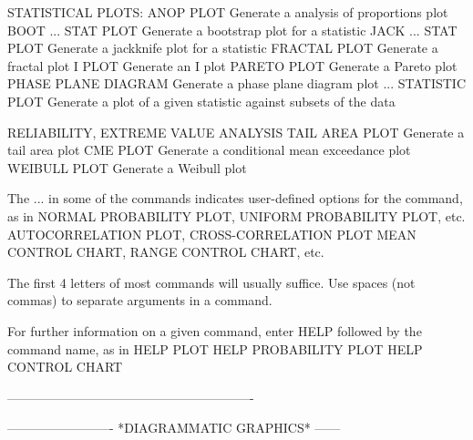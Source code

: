 STATISTICAL PLOTS:
   ANOP PLOT             Generate a analysis of proportions plot
   BOOT ... STAT PLOT    Generate a bootstrap plot for a statistic
   JACK ... STAT PLOT    Generate a jackknife plot for a statistic
   FRACTAL PLOT          Generate a fractal plot
   I PLOT                Generate an I plot
   PARETO PLOT           Generate a Pareto plot
   PHASE PLANE DIAGRAM   Generate a phase plane diagram plot
   ... STATISTIC PLOT    Generate a plot of a given statistic against
                         subsets of the data
 
RELIABILITY, EXTREME VALUE ANALYSIS
   TAIL AREA PLOT        Generate a tail area plot
   CME PLOT              Generate a conditional mean exceedance plot
   WEIBULL PLOT          Generate a Weibull plot
 
The ... in some of the commands indicates user-defined options for the
command, as in
   NORMAL PROBABILITY PLOT, UNIFORM PROBABILITY PLOT, etc.
   AUTOCORRELATION PLOT, CROSS-CORRELATION PLOT
   MEAN CONTROL CHART, RANGE CONTROL CHART, etc.
 
The first 4 letters of most commands will usually suffice.  Use spaces
(not commas) to separate arguments in a command.
 
For further information on a given command, enter HELP   followed by
the command name, as in
   HELP PLOT
   HELP PROBABILITY PLOT
   HELP CONTROL CHART
 
----------------------------------------------------------
 
 
 
 
 
 
 
 
 
 
 
 
 
 
 
 
 
 
 
 
 
 
 
 
 
 
 
 
 
 
 
 
 
 
 
 
 
 
 
 
 
 
 
 
 
 
 
-------------------------  *DIAGRAMMATIC GRAPHICS*  ------
 
